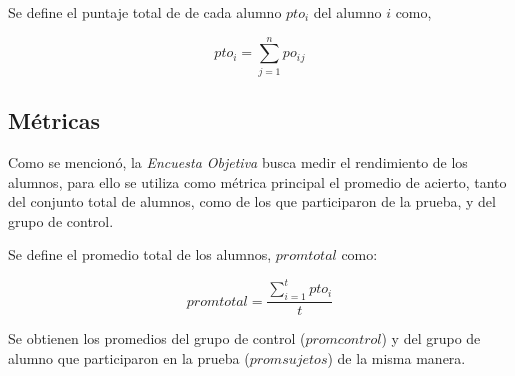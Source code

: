 Se define el puntaje total de de cada alumno $pto_i$ del alumno $i$ como, 

\begin{equation*}
    pto_i = \sum_{j=1}^n{po_i{_j}}
\end{equation*}


\subsection{Métricas}

Como se mencionó, la \emph{Encuesta Objetiva} busca medir el rendimiento de los 
alumnos, para ello se utiliza como métrica principal el promedio de acierto, 
tanto del conjunto total de alumnos, como de los que participaron de la
prueba, y del grupo de control.

Se define el promedio total de los alumnos, $promtotal$ como:

\begin{equation*}
    promtotal = \frac{\sum_{i=1}^t{pto_i}}{t}
\end{equation*}

Se obtienen los promedios del grupo de control ($promcontrol$) y del grupo de alumno que
participaron en la prueba ($promsujetos$) de la misma manera.
